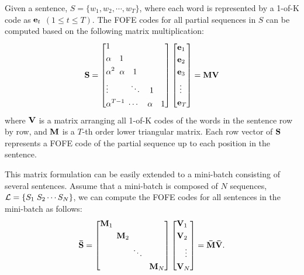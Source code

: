 \documentclass[11pt]{article}
\begin{document}
Given a sentence, $S = \{  {w}_1, {w}_2,   \cdots, {w}_T \} $, where each word is represented by a 1-of-K code as ${\bf e}_t$ $(1\leq t \leq T)$. The FOFE codes for all partial sequences in $S$ can be computed based on the following matrix multiplication:  
\begin{equation}\nonumber
{\bf S} = \left[ \begin{gathered}
1 \hfill \\
\alpha \quad 1 \hfill \\
{\alpha ^2}\;\;\alpha \quad 1 \hfill \\
\vdots \quad \;\;\quad  \ddots \quad 1 \hfill \\
{\alpha ^{T - 1}}\; \cdots \quad \alpha \quad 1 \hfill \\ 
\end{gathered}  \right] \left[ \begin{gathered}
{\bf e}_1 \hfill \\
{\bf e}_2 \hfill \\
{\bf e}_3 \hfill \\
\hspace{0.1cm} \vdots  \hfill \\
{\bf e}_T \hfill \\ 
\end{gathered}  \right] = {\bf M} {\bf V}
\end{equation}
where ${\bf V}$ is a matrix arranging all 1-of-K codes of the words in the sentence row by row, and ${\bf M}$ is a $T$-th order lower triangular matrix. Each row vector of ${\bf S}$ represents a FOFE code of the partial sequence up to each position in the sentence. 

This matrix formulation can be easily extended to a mini-batch consisting of several sentences.
Assume that a mini-batch is composed of $N$ sequences, ${\cal L}=\{ S_1 \; S_2 \cdots S_N\}$, we can compute the FOFE codes for all sentences in the mini-batch as follows:
\begin{equation}\nonumber
{\bf \bar{S}} =\left[ \begin{gathered}
 {\bf M}_1 \hfill \\
\qquad  {\bf M}_2 \hfill \\
\qquad \qquad  \ddots  \hfill \\
\qquad \qquad \qquad  {\bf M}_N\hfill \\ 
\end{gathered}  \right]  \left[ \begin{gathered}
{\bf V}_1 \hfill \\
{\bf V}_2\hfill \\
\quad  \vdots  \hfill \\
{\bf V}_N \hfill \\ 
\end{gathered}  \right] = {\bf \bar{M}} {\bf \bar{V}}.
\end{equation}
\end{document}
